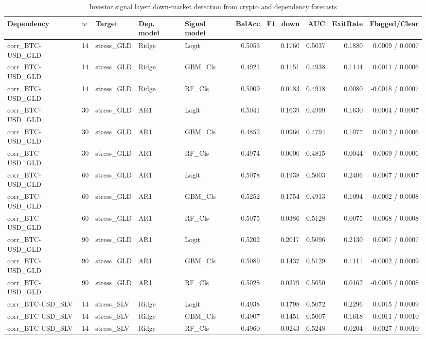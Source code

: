 \begin{table}[H]
\centering
\small
\caption{Investor signal layer: down-market detection from crypto and dependency forecasts}
\label{tab:signal_metrics}
\begin{tabular}{lllllrrrrr}
\toprule
Dependency & $w$ & Target & Dep. model & Signal model & BalAcc & F1_down & AUC & ExitRate & Flagged/Clear \\
\midrule
corr_BTC-USD_GLD & 14 & stress_GLD & Ridge & Logit & 0.5053 & 0.1760 & 0.5037 & 0.1880 & 0.0009 / 0.0007 \\
corr_BTC-USD_GLD & 14 & stress_GLD & Ridge & GBM_Cls & 0.4921 & 0.1151 & 0.4938 & 0.1144 & 0.0011 / 0.0006 \\
corr_BTC-USD_GLD & 14 & stress_GLD & Ridge & RF_Cls & 0.5009 & 0.0183 & 0.4918 & 0.0080 & -0.0018 / 0.0007 \\
corr_BTC-USD_GLD & 30 & stress_GLD & AR1 & Logit & 0.5041 & 0.1639 & 0.4999 & 0.1630 & 0.0004 / 0.0007 \\
corr_BTC-USD_GLD & 30 & stress_GLD & AR1 & GBM_Cls & 0.4852 & 0.0966 & 0.4794 & 0.1077 & 0.0012 / 0.0006 \\
corr_BTC-USD_GLD & 30 & stress_GLD & AR1 & RF_Cls & 0.4974 & 0.0000 & 0.4815 & 0.0044 & 0.0069 / 0.0006 \\
corr_BTC-USD_GLD & 60 & stress_GLD & AR1 & Logit & 0.5078 & 0.1938 & 0.5003 & 0.2406 & 0.0007 / 0.0007 \\
corr_BTC-USD_GLD & 60 & stress_GLD & AR1 & GBM_Cls & 0.5252 & 0.1754 & 0.4913 & 0.1094 & -0.0002 / 0.0008 \\
corr_BTC-USD_GLD & 60 & stress_GLD & AR1 & RF_Cls & 0.5075 & 0.0386 & 0.5128 & 0.0075 & -0.0068 / 0.0008 \\
corr_BTC-USD_GLD & 90 & stress_GLD & AR1 & Logit & 0.5202 & 0.2017 & 0.5096 & 0.2130 & 0.0007 / 0.0007 \\
corr_BTC-USD_GLD & 90 & stress_GLD & AR1 & GBM_Cls & 0.5089 & 0.1437 & 0.5129 & 0.1111 & -0.0002 / 0.0009 \\
corr_BTC-USD_GLD & 90 & stress_GLD & AR1 & RF_Cls & 0.5028 & 0.0379 & 0.5050 & 0.0162 & -0.0005 / 0.0008 \\
corr_BTC-USD_SLV & 14 & stress_SLV & Ridge & Logit & 0.4938 & 0.1798 & 0.5072 & 0.2296 & 0.0015 / 0.0009 \\
corr_BTC-USD_SLV & 14 & stress_SLV & Ridge & GBM_Cls & 0.4907 & 0.1451 & 0.5007 & 0.1618 & 0.0011 / 0.0010 \\
corr_BTC-USD_SLV & 14 & stress_SLV & Ridge & RF_Cls & 0.4960 & 0.0243 & 0.5248 & 0.0204 & 0.0027 / 0.0010 \\

\end{tabular}
\end{table}
